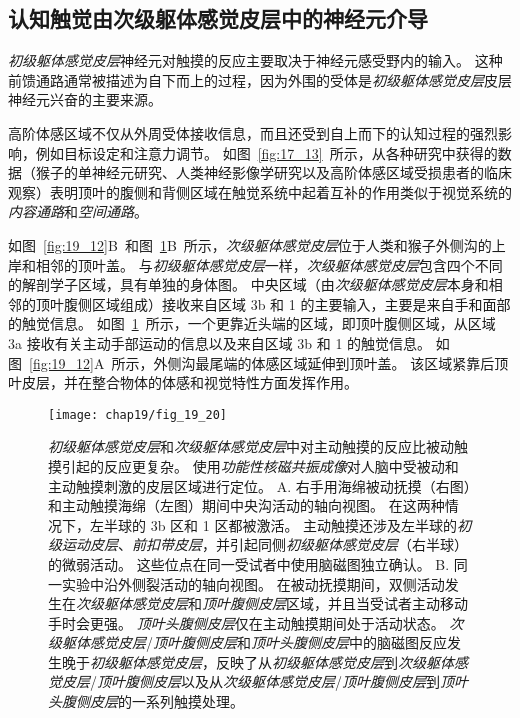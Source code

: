 \subsection{认知触觉由次级躯体感觉皮层中的神经元介导}

\textit{初级躯体感觉皮层}神经元对触摸的反应主要取决于神经元感受野内的输入。
这种前馈通路通常被描述为自下而上的过程，因为外围的受体是\textit{初级躯体感觉皮层}皮层神经元兴奋的主要来源。


高阶体感区域不仅从外周受体接收信息，而且还受到自上而下的认知过程的强烈影响，例如目标设定和注意力调节。
如图~\ref{fig:17_13}~所示，从各种研究中获得的数据（猴子的单神经元研究、人类神经影像学研究以及高阶体感区域受损患者的临床观察）表明顶叶的腹侧和背侧区域在触觉系统中起着互补的作用类似于视觉系统的\textit{内容通路}和\textit{空间通路}。


如图~\ref{fig:19_12}B~和图~\ref{fig:19_20}B~所示，\textit{次级躯体感觉皮层}位于人类和猴子外侧沟的上岸和相邻的顶叶盖。
与\textit{初级躯体感觉皮层}一样，\textit{次级躯体感觉皮层}包含四个不同的解剖学子区域，具有单独的身体图。
中央区域（由\textit{次级躯体感觉皮层}本身和相邻的顶叶腹侧区域组成）接收来自区域 3b 和 1 的主要输入，主要是来自手和面部的触觉信息。
如图~\ref{fig:19_20}~所示，一个更靠近头端的区域，即顶叶腹侧区域，从区域 3a 接收有关主动手部运动的信息以及来自区域 3b 和 1 的触觉信息。
如图~\ref{fig:19_12}A~所示，外侧沟最尾端的体感区域延伸到顶叶盖。
该区域紧靠后顶叶皮层，并在整合物体的体感和视觉特性方面发挥作用。


\begin{figure}[htbp]
	\centering
	\texttt{[image: chap19/fig\_19\_20]}
	\caption{\textit{初级躯体感觉皮层}和\textit{次级躯体感觉皮层}中对主动触摸的反应比被动触摸引起的反应更复杂。
		使用\textit{功能性核磁共振成像}对人脑中受被动和主动触摸刺激的皮层区域进行定位\cite{hinkley2007sensorimotor}。
		A. 右手用海绵被动抚摸（右图）和主动触摸海绵（左图）期间中央沟活动的轴向视图。 在这两种情况下，左半球的 3b 区和 1 区都被激活。
		主动触摸还涉及左半球的\textit{初级运动皮层}、\textit{前扣带皮层}，并引起同侧\textit{初级躯体感觉皮层}（右半球）的微弱活动。
		这些位点在同一受试者中使用脑磁图独立确认。
		B. 同一实验中沿外侧裂活动的轴向视图。
		在被动抚摸期间，双侧活动发生在\textit{次级躯体感觉皮层}和\textit{顶叶腹侧皮层}区域，并且当受试者主动移动手时会更强。
		\textit{顶叶头腹侧皮层}仅在主动触摸期间处于活动状态。
		\textit{次级躯体感觉皮层}/\textit{顶叶腹侧皮层}和\textit{顶叶头腹侧皮层}中的脑磁图反应发生晚于\textit{初级躯体感觉皮层}，反映了从\textit{初级躯体感觉皮层}到\textit{次级躯体感觉皮层}/\textit{顶叶腹侧皮层}以及从\textit{次级躯体感觉皮层}/\textit{顶叶腹侧皮层}到\textit{顶叶头腹侧皮层}的一系列触摸处理。}
	\label{fig:19_20}
\end{figure}


